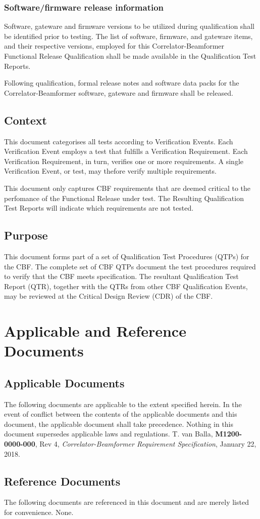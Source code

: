 \subsection{Software/firmware release information}
Software, gateware and firmware versions to be utilized during qualification shall be identified prior to testing. The list of software, firmware, and gateware items, and their respective versions, employed for this Correlator-Beamformer Functional Release Qualification shall be made available in the Qualification Test Reports.

Following qualification, formal release notes and software data packs for the Correlator-Beamformer software, gateware and firmware shall be released.
\section{Context}
This document categorises all tests according to Verification Events. Each Verification Event employs a test that fulfills a Verification Requirement. Each Verification Requirement, in turn, verifies one or more requirements. A single Verification Event, or test, may thefore verify multiple requirements.

This document only captures CBF requirements that are deemed critical to the perfomance of the Functional Release under test. The Resulting Qualification Test Reports will indicate which requirements are not tested.
\section{Purpose}
This document forms part of a set of Qualification Test Procedures (QTPs) for the CBF. The complete set of CBF QTPs document the test procedures required to verify that the CBF meets specification.
The resultant Qualification Test Report (QTR), together with the QTRs from other CBF Qualification Events, may be reviewed at the Critical Design Review (CDR) of the CBF.
\chapter{Applicable and Reference Documents}
\section{Applicable Documents}
The following documents are applicable to the extent specified herein. In the event of conflict between the contents of the applicable documents and this document, the applicable document shall take precedence.  Nothing in this document supersedes applicable laws and regulations.
\newline\newline
[1]\hspace{10mm} T. van Balla, {\bf M1200-0000-000}, Rev 4, {\it Correlator-Beamformer Requirement Specification}, January 22, 2018.
\section{Reference Documents}
The following documents are referenced in this document and are merely listed for convenience.\newline\newline
\hspace{10mm}None.
